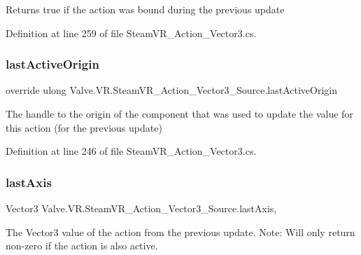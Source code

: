 Returns true if the action was bound during the previous update 



Definition at line 259 of file Steam\+V\+R\+\_\+\+Action\+\_\+\+Vector3.\+cs.

\mbox{\label{class_valve_1_1_v_r_1_1_steam_v_r___action___vector3___source_a9249c5e84bc62f85642b01ddd17bbc57}} 
\subsubsection{\texorpdfstring{lastActiveOrigin}{lastActiveOrigin}}
{\footnotesize\ttfamily override ulong Valve.\+V\+R.\+Steam\+V\+R\+\_\+\+Action\+\_\+\+Vector3\+\_\+\+Source.\+last\+Active\+Origin\hspace{0.3cm}{\ttfamily [get]}}



The handle to the origin of the component that was used to update the value for this action (for the previous update) 



Definition at line 246 of file Steam\+V\+R\+\_\+\+Action\+\_\+\+Vector3.\+cs.

\mbox{\label{class_valve_1_1_v_r_1_1_steam_v_r___action___vector3___source_a6746385376c909af457b3c2573a95607}} 
\subsubsection{\texorpdfstring{lastAxis}{lastAxis}}
{\footnotesize\ttfamily Vector3 Valve.\+V\+R.\+Steam\+V\+R\+\_\+\+Action\+\_\+\+Vector3\+\_\+\+Source.\+last\+Axis\hspace{0.3cm}{\ttfamily [get]}, {}}



The Vector3 value of the action from the previous update. Note\+: Will only return non-\/zero if the action is also active. 



